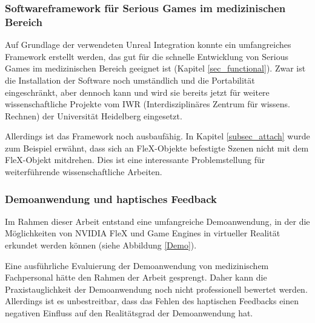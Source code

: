 \subsubsection{Softwareframework für Serious Games im medizinischen Bereich}
Auf Grundlage der verwendeten Unreal Integration konnte ein umfangreiches Framework erstellt  werden, das gut für die schnelle Entwicklung von Serious Games im medizinischen Bereich geeignet ist (Kapitel \ref{sec_functional}). 
Zwar ist die Installation der Software noch umständlich  und die Portabilität eingeschränkt, aber dennoch kann und wird sie bereits jetzt für weitere wissenschaftliche Projekte vom IWR (Interdisziplinäres Zentrum für wissens. Rechnen) der Universität Heidelberg eingesetzt. 

Allerdings ist das Framework noch ausbaufähig. In Kapitel \ref{subsec_attach} wurde zum Beispiel erwähnt, dass sich an FleX-Objekte befestigte Szenen nicht mit dem FleX-Objekt mitdrehen. Dies ist eine interessante Problemstellung für weiterführende wissenschaftliche Arbeiten.

\subsubsection{Demoanwendung und haptisches Feedback}
Im Rahmen dieser Arbeit entstand eine umfangreiche Demoanwendung, in der die Möglichkeiten von NVIDIA FleX und Game Engines in virtueller Realität erkundet werden können (siehe Abbildung \ref{Demo}). 


Eine ausführliche Evaluierung der Demoanwendung von medizinischem Fachpersonal hätte den Rahmen der Arbeit gesprengt. Daher kann die Praxistauglichkeit der Demoanwendung noch nicht professionell bewertet werden.
Allerdings ist es unbestreitbar, dass das Fehlen des haptischen Feedbacks einen negativen Einfluss auf den Realitätsgrad der Demoanwendung hat.

